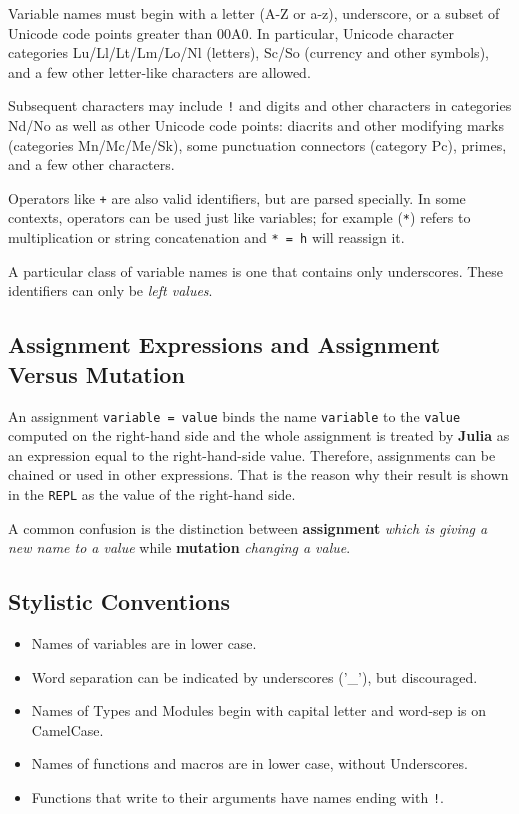 \documentclass[
]{article}
\providecommand{\tightlist}{%
  \setlength{\itemsep}{0pt}\setlength{\parskip}{0pt}}
\begin{document}
Variable names must begin with a letter (A-Z or a-z), underscore, or a
subset of Unicode code points greater than 00A0. In particular, Unicode
character categories Lu/Ll/Lt/Lm/Lo/Nl (letters), Sc/So (currency and
other symbols), and a few other letter-like characters are allowed.

Subsequent characters may include \texttt{!} and digits and other
characters in categories Nd/No as well as other Unicode code points:
diacrits and other modifying marks (categories Mn/Mc/Me/Sk), some
punctuation connectors (category Pc), primes, and a few other
characters.

Operators like \texttt{+} are also valid identifiers, but are parsed
specially. In some contexts, operators can be used just like variables;
for example (\texttt{*}) refers to multiplication or string
concatenation and \texttt{*\ =\ h} will reassign it.

A particular class of variable names is one that contains only
underscores. These identifiers can only be \emph{left values}.

\hypertarget{assignment-expressions-and-assignment-versus-mutation}{%
\subsection{Assignment Expressions and Assignment Versus
Mutation}\label{assignment-expressions-and-assignment-versus-mutation}}

An assignment \texttt{variable\ =\ value} binds the name
\texttt{variable} to the \texttt{value} computed on the right-hand side
and the whole assignment is treated by \textbf{Julia} as an expression
equal to the right-hand-side value. Therefore, assignments can be
chained or used in other expressions. That is the reason why their
result is shown in the \texttt{REPL} as the value of the right-hand
side.

A common confusion is the distinction between \textbf{assignment}
\emph{which is giving a new name to a value} while \textbf{mutation}
\emph{changing a value}.

\hypertarget{stylistic-conventions}{%
\subsection{Stylistic Conventions}\label{stylistic-conventions}}

\begin{itemize}
\tightlist
\item
  Names of variables are in lower case.
\item
  Word separation can be indicated by underscores ('\_'), but
  discouraged.
\item
  Names of Types and Modules begin with capital letter and word-sep is
  on CamelCase.
\item
  Names of functions and macros are in lower case, without Underscores.
\item
  Functions that write to their arguments have names ending with
  \texttt{!}.
\end{itemize}
\end{document}
